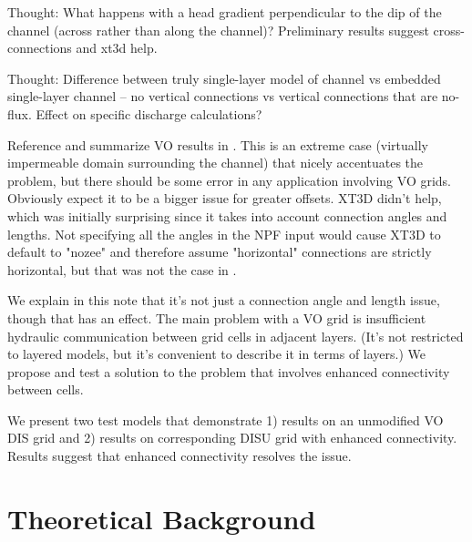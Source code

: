 \documentclass{article}
\begin{document}
Thought: What happens with a head gradient perpendicular to the dip of the channel (across rather than along the channel)? Preliminary results suggest cross-connections and xt3d help.

Thought: Difference between truly single-layer model of channel vs embedded single-layer channel -- no vertical connections vs vertical connections that are no-flux. Effect on specific discharge calculations?

Reference and summarize VO results in \cite{bardot2022}. This is an extreme case (virtually impermeable domain surrounding the channel) that nicely accentuates the problem, but there should be some error in any application involving VO grids. Obviously expect it to be a bigger issue for greater offsets. XT3D didn't help, which was initially surprising since it takes into account connection angles and lengths. Not specifying all the angles in the NPF input would cause XT3D to default to "nozee" and therefore assume "horizontal" connections are strictly horizontal, but that was not the case in \cite{bardot2022}.

We explain in this note that it's not just a connection angle and length issue, though that has an effect.  The main problem with a VO grid is insufficient hydraulic communication between grid cells in adjacent layers. (It's not restricted to layered models, but it's convenient to describe it in terms of layers.)  We propose and test a solution to the problem that involves enhanced connectivity between cells.

We present two test models that demonstrate 1) results on an unmodified VO DIS grid and 2) results on corresponding DISU grid with enhanced connectivity. Results suggest that enhanced connectivity resolves the issue.


\section{Theoretical Background}
\end{document}
